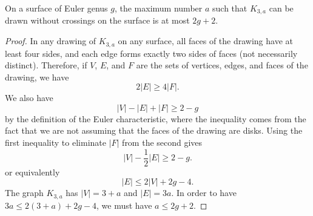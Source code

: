 \documentclass[10pt,a4paper]{amsart}
\begin{document}
\begin{lemma}
\label{lem:genus-bipartite}
On a surface of Euler genus $g$, the maximum number $a$ such that $K_{3,a}$ can be drawn without crossings on the surface is at most $2g+2$.
\end{lemma}

\begin{proof}
In any drawing of $K_{3,a}$ on any surface, all faces of the drawing have at least four sides, and each edge forms exactly two sides of faces (not necessarily distinct). Therefore, if $V$, $E$, and $F$ are the sets of vertices, edges, and faces of the drawing, we have  
\[
2|E|\ge 4|F|.\]
We also have
\[
|V|-|E|+|F|\ge 2-g
\]
by the definition of the Euler characteristic, where the inequality comes from the fact that we are not assuming that the faces of the drawing are disks. Using the first inequality to eliminate $|F|$ from the second gives
\[
|V|-\frac12 |E|\ge 2-g.
\]
or equivalently
\[
|E|\le 2|V| + 2g - 4.
\]
The graph $K_{3,a}$ has $|V|=3+a$ and $|E|=3a$. In order to have $3a\le 2(3+a)+2g-4$,
we must have $a\le 2g+2$.
\end{proof}
\end{document}
